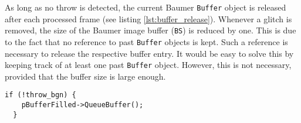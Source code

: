 As long as no throw is detected, the current Baumer \texttt{Buffer} object is released after each processed frame (see listing \ref{lst:buffer_release}).
Whenever a glitch is removed, the size of the Baumer image buffer (\texttt{BS}) is reduced by one.
This is due to the fact that no reference to past \texttt{Buffer} objects is kept.
Such a reference is necessary to release the respective buffer entry.
It would be easy to solve this by keeping track of at least one past \texttt{Buffer} object.
However, this is not necessary, provided that the buffer size is large enough.
\vspace{5pt}
\begin{lstlisting}[style=C++, caption={Release of the filled Baumer \texttt{Buffer} object}, label=lst:buffer_release]
  if (!throw_bgn) {
    pBufferFilled->QueueBuffer();
  }
\end{lstlisting}






